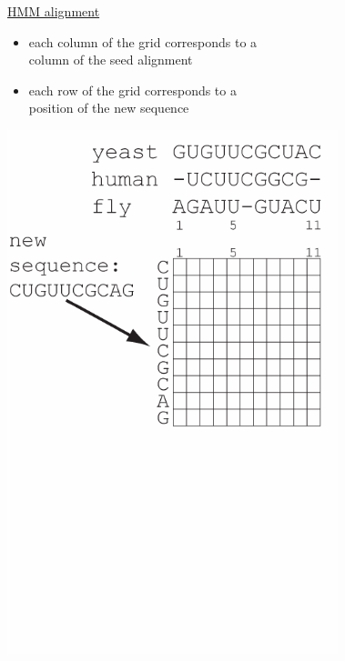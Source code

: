 \documentclass[landscape]{slides}
\begin{document}
\begin{slide}
\begin{minipage}{6in}
\begin{itemize}
\end{itemize}
\small
\hspace{0.3in}
\underline{HMM alignment}%
\begin{itemize}
\item
each column of the grid corresponds to a \\ column
of the seed alignment
\item
each row of the grid corresponds to a \\ position of the new sequence
\end{itemize}
\vspace{3in}
\end{minipage}
\begin{minipage}{4in}
\begin{center}
\includegraphics[height=6in]{figs/hmm_alignment2_layer1}
\end{center}
\vspace{1.5in}
\end{minipage}
\end{slide}
\end{document}
